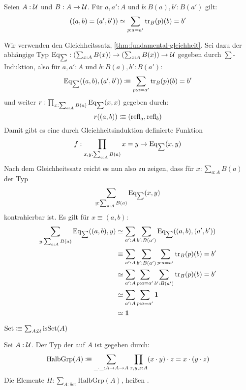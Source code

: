 \begin{lemma}
  \label{lem:gleichheit-summe}
  Seien $A:\mathcal{U}$ und $B:A\to \mathcal{U}$. Für $a,a':A$ und $b:B(a), b':B(a')$ gilt:
  \[
    \left((a,b)=(a',b')\right)\simeq \sum_{p:a=a'}\mathrm{tr}_B(p)(b)=b'
  \]
\end{lemma}
\begin{beweis}
  Wir verwenden den Gleichheitssatz, \cref{thm:fundamental-gleichheit}.
  Sei dazu der abhängige Typ $\mathrm{Eq}_{\sum}:\left(\sum_{x:A}B(x)\right)\to\left(\sum_{x:A}B(x)\right)\to\mathcal{U}$ gegeben durch $\sum$-Induktion, also für $a,a':A$ und $b:B(a),b':B(a')$:
  \begin{align*}
    \mathrm{Eq}_{\sum}((a,b),(a',b'))\vcentcolon\mspace{-1.2mu}\equiv \sum_{p:a=a'}\mathrm{tr}_B(p)(b)=b'
  \end{align*}
  und weiter $r:\prod_{x:\sum_{a:A}B(a)}\mathrm{Eq}_{\sum}(x,x)$ gegeben durch:
  \[
    r((a,b))\vcentcolon\mspace{-1.2mu}\equiv (\mathrm{refl}_a, \mathrm{refl}_b)
  \]
  Damit gibt es eine durch Gleichheitsinduktion definierte Funktion
  \[
    f:\prod_{x,y:\sum_{a:A}B(a)}x=y\to \mathrm{Eq}_{\sum}(x,y)
  \]
  Nach dem Gleichheitssatz reicht es nun also zu zeigen, dass für $x:\sum_{a:A}B(a)$ der Typ
  \[
    \sum_{y:\sum_{a:A}B(a)}\mathrm{Eq}_{\sum}(x,y)
  \]
  kontrahierbar ist. Es gilt für $x\equiv(a,b)$:
  \begin{align*}
    \sum_{y:\sum_{a:A}B(a)}\mathrm{Eq}_{\sum}((a,b),y)&\simeq \sum_{a':A}\sum_{b':B(a')}\mathrm{Eq}_{\sum}((a,b),(a',b')) \\
                                             &\equiv \sum_{a':A}\sum_{b':B(a')} \sum_{p:a=a'}\mathrm{tr}_B(p)(b)=b' \\
                                             &\simeq \sum_{a':A}\sum_{p:a=a'} \sum_{b':B(a')} \mathrm{tr}_B(p)(b)=b' \\
                                             &\simeq \sum_{a':A}\sum_{p:a=a'} \mathbf{1} \\
                                             &\simeq \mathbf{1}
  \end{align*}
\end{beweis}

\begin{definition}
  $\mathrm{Set}\vcentcolon\mspace{-1.2mu}\equiv\sum_{A:\mathcal{U}}\mathrm{isSet}(A)$
\end{definition}

\begin{definition}
  Sei $A:\mathcal{U}$. Der Typ der  auf $A$ ist gegeben durch:
  \[
    \mathrm{HalbGrp}(A)\vcentcolon\mspace{-1.2mu}\equiv \sum_{\_\cdot\_:A\to A\to A}\prod_{x,y,z:A} (x \cdot y) \cdot z = x \cdot (y \cdot z)
  \]
  Die Elemente $H:\sum_{A:\mathrm{Set}}\mathrm{HalbGrp}(A)$, heißen .
\end{definition}

